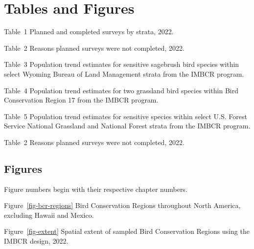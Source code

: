 \documentclass[
  letterpaper,
  DIV=11,
  numbers=noendperiod,
  oneside]{scrreprt}
\begin{document}

\hypertarget{tables-and-figures}{%
\chapter{Tables and Figures}\label{tables-and-figures}}

Table~{1} Planned and completed surveys by strata, 2022.

Table~{2} Reasons planned surveys were not completed, 2022.

Table~{3} Population trend estimates for sensitive sagebrush bird
species within select Wyoming Bureau of Land Management strata from the
IMBCR program.

Table~{4} Population trend estimates for two grassland bird species
within Bird Conservation Region 17 from the IMBCR program.

Table~{5} Population trend estimates for sensitive species within select
U.S. Forest Service National Grassland and National Forest strata from
the IMBCR program.

Table~{2} Reasons planned surveys were not completed, 2022.

\hypertarget{figures}{%
\section*{Figures}\label{figures}}


\begin{tcolorbox}[enhanced jigsaw, breakable, colframe=quarto-callout-note-color-frame, toprule=.15mm, titlerule=0mm, leftrule=.75mm, toptitle=1mm, title=\textcolor{quarto-callout-note-color}{\faInfo}\hspace{0.5em}{Note}, opacityback=0, bottomtitle=1mm, coltitle=black, bottomrule=.15mm, colbacktitle=quarto-callout-note-color!10!white, left=2mm, arc=.35mm, rightrule=.15mm, colback=white, opacitybacktitle=0.6]

Figure numbers begin with their respective chapter numbers.

\end{tcolorbox}

Figure~\ref{fig-bcr-regions} Bird Conservation Regions throughout North
America, excluding Hawaii and Mexico.

Figure~\ref{fig-extent} Spatial extent of sampled Bird Conservation
Regions using the IMBCR design, 2022.
\end{document}
